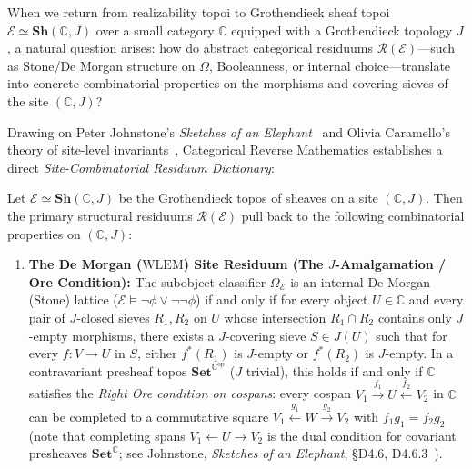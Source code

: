 When we return from realizability topoi to Grothendieck sheaf topoi $\mathcal{E} \simeq \mathbf{Sh}(\mathbb{C}, J)$ over a small category $\mathbb{C}$ equipped with a Grothendieck topology $J$, a natural question arises: how do abstract categorical residuums $\mathcal{R}(\mathcal{E})$---such as Stone/De Morgan structure on $\Omega$, Booleanness, or internal choice---translate into concrete combinatorial properties on the morphisms and covering sieves of the site $(\mathbb{C}, J)$?

Drawing on Peter Johnstone's \emph{Sketches of an Elephant}~\cite{Johnstone02} and Olivia Caramello's theory of site-level invariants~\cite{Caramello18}, Categorical Reverse Mathematics establishes a direct \emph{Site-Combinatorial Residuum Dictionary}:

\begin{theorem}\label{thm:site-dictionary}%
%

Let $\mathcal{E} \simeq \mathbf{Sh}(\mathbb{C}, J)$ be the Grothendieck topos of sheaves on a site $(\mathbb{C}, J)$. Then the primary structural residuums $\mathcal{R}(\mathcal{E})$ pull back to the following combinatorial properties on $(\mathbb{C}, J)$:

\begin{enumerate}

  \item \textbf{The De Morgan ($\mathrm{WLEM}$) Site Residuum (The $J$-Amalgamation / Ore Condition):} The subobject classifier $\Omega_{\mathcal{E}}$ is an internal De Morgan (Stone) lattice ($\mathcal{E} \models \neg\phi \vee \neg\neg\phi$) if and only if for every object $U \in \mathbb{C}$ and every pair of $J$-closed sieves $R_1, R_2$ on $U$ whose intersection $R_1 \cap R_2$ contains only $J$-empty morphisms, there exists a $J$-covering sieve $S \in J(U)$ such that for every $f: V \to U$ in $S$, either $f^*(R_1)$ is $J$-empty or $f^*(R_2)$ is $J$-empty. In a contravariant presheaf topos $\mathbf{Set}^{\mathbb{C}^{\mathrm{op}}}$ ($J$ trivial), this holds if and only if $\mathbb{C}$ satisfies the \emph{Right Ore condition on cospans}: every cospan $V_1 \xrightarrow{f_1} U \xleftarrow{f_2} V_2$ in $\mathbb{C}$ can be completed to a commutative square $V_1 \xleftarrow{g_1} W \xrightarrow{g_2} V_2$ with $f_1 g_1 = f_2 g_2$ (note that completing spans $V_1 \leftarrow U \rightarrow V_2$ is the dual condition for covariant presheaves $\mathbf{Set}^{\mathbb{C}}$; see Johnstone, \emph{Sketches of an Elephant}, \S D4.6, D4.6.3~\cite{Johnstone02}).


\end{enumerate}
\end{theorem}

